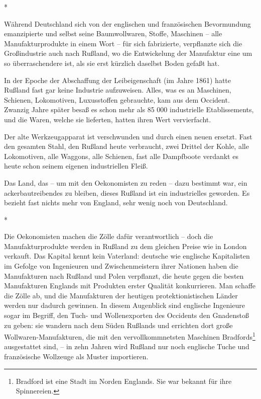 \documentclass{scrbook}
\begin{document}
\begin{center}*\end{center}

Während Deutschland sich von der englischen und französischen Bevormundung emanzipierte und selbst seine Baumwollwaren, Stoffe, Maschinen – alle Manufakturprodukte in einem Wort – für sich fabrizierte, verpflanzte sich die Großindustrie auch nach Rußland, wo die Entwickelung der Manufaktur eine um so überraschendere ist, als sie erst kürzlich daselbst Boden gefaßt hat.

In der Epoche der Abschaffung der Leibeigenschaft (im Jahre 1861) hatte Rußland fast gar keine Industrie aufzuweisen. Alles, was es an Maschinen, Schienen, Lokomotiven, Luxusstoffen gebrauchte, kam aus dem Occident. Zwanzig Jahre später besaß es schon mehr als 85 000 industrielle Etablissements, und die Waren, welche sie lieferten, hatten ihren Wert vervierfacht.

Der alte Werkzeugapparat ist verschwunden und durch einen neuen ersetzt. Fast den gesamten Stahl, den Rußland heute verbraucht, zwei Drittel der Kohle, alle Lokomotiven, alle Waggons, alle Schienen, fast alle Dampfboote verdankt es heute schon seinem eigenen industriellen Fleiß.

Das Land, das – um mit den Oekonomisten zu reden – dazu bestimmt war, ein ackerbautreibendes zu bleiben, dieses Rußland ist ein industrielles geworden. Es bezieht fast nichts mehr von England, sehr wenig noch von Deutschland.

\begin{center}*\end{center}

Die Oekonomisten machen die Zölle dafür verantwortlich – doch die Manufakturprodukte werden in Rußland zu dem gleichen Preise wie in London verkauft. Das Kapital kennt kein Vaterland: deutsche wie englische Kapitalisten im Gefolge von Ingenieuren und Zwischenmeistern ihrer Nationen haben die Manufakturen nach Rußland und Polen verpflanzt, die heute gegen die besten Manufakturen Englands mit Produkten erster Qualität konkurrieren. Man schaffe die Zölle ab, und die Manufakturen der heutigen protektionistischen Länder werden nur dadurch gewinnen. In diesem Augenblick sind englische Ingenieure sogar im Begriff, den Tuch- und Wollenexporten des Occidents den Gnadenstoß zu geben: sie wandern nach dem Süden Rußlands und errichten dort große Wollwaren-Manufakturen, die mit den vervollkommnetsten Maschinen Bradfords\footnote{Bradford ist eine Stadt im Norden Englands. Sie war bekannt für ihre Spinnereien.} ausgestattet sind, – in zehn Jahren wird Rußland nur noch englische Tuche und französische Wollzeuge als Muster importieren.
\end{document}
